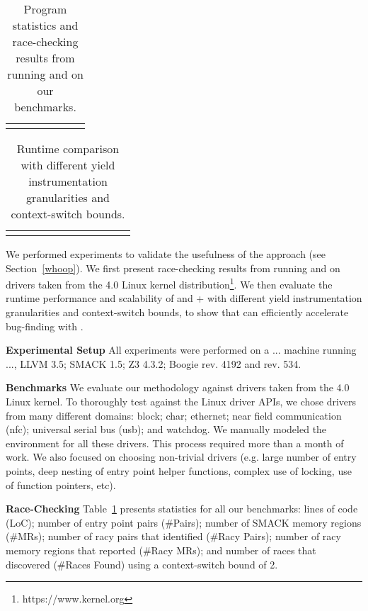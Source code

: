 \newcommand{\colspacing}{\hspace{1.8em}}
\begin{table}[t]
\small
\centering
\setlength{\tabcolsep}{0.3em}
\caption{Program statistics and race-checking results from running \whoop and \corral on our benchmarks.}
\label{tab:stats}
\begin{tabular}{l rrr rr r}
\centering

\end{tabular}
\end{table}

\begin{table*}[t]
\small
\centering
\caption{Runtime comparison with different yield instrumentation granularities and context-switch bounds.}
\label{tab:results}
\begin{tabular}{l rrr rrr rr r r}
\centering

\end{tabular}
\end{table*}

We performed experiments to validate the usefulness of the \whoop approach (see Section~\ref{whoop}). We first present race-checking results from running \whoop and \corral on \sizeOfBenchmarks drivers taken from the 4.0 Linux kernel distribution\footnote{https://www.kernel.org}. We then evaluate the runtime performance and scalability of \corral and \whoop + \corral with different yield instrumentation granularities and context-switch bounds, to show that \whoop can efficiently accelerate bug-finding with \corral.

\noindent
\textbf{Experimental Setup}\xspace\xspace All experiments were performed on a ... machine running ..., LLVM 3.5; SMACK 1.5; Z3 4.3.2; Boogie rev. 4192 and \corral rev. 534.

\noindent
\textbf{Benchmarks}\xspace\xspace We evaluate our methodology against \sizeOfBenchmarks drivers taken from the 4.0 Linux kernel. To thoroughly test \whoop against the Linux driver APIs, we chose drivers from many different domains: block; char; ethernet; near field communication (nfc); universal serial bus (usb); and watchdog. We manually modeled the environment for all these drivers. This process required more than a month of work. We also focused on choosing non-trivial drivers (e.g. large number of entry points, deep nesting of entry point helper functions, complex use of locking, use of function pointers, etc).

\noindent
\textbf{Race-Checking}\xspace\xspace Table~\ref{tab:stats} presents statistics for all our benchmarks: lines of code (LoC); number of entry point pairs (\#Pairs); number of SMACK memory regions (\#MRs); number of racy pairs that \whoop identified (\#Racy Pairs); number of racy memory regions that \whoop reported (\#Racy MRs); and number of races that \corral discovered (\#Races Found) using a context-switch bound of 2.

